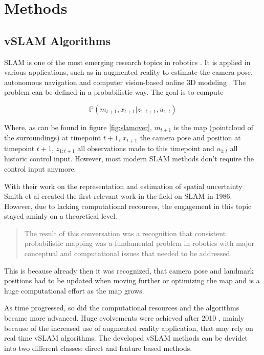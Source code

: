 \chapter{Methods}
\section{vSLAM Algorithms}

SLAM is one of the most emerging research topics in robotics \cite{slamintro}. It is applied in various applications, such as in augmented reality to estimate the camera pose,
autonomous navigation and computer vision-based online 3D modeling \cite{evolved} \cite{dso}.
The problem can be defined in a probabilistic way. The goal is to compute 

$$\mathbb{P}\left(m_{t+1},x_{t+1}|z_{1:t+1},u_{1:t}\right)$$

Where, as can be found in figure \ref{fig:slamover}, $m_{t+1}$ is the map (pointcloud of the surroundings) at timepoint $t+1$, $x_{t+1}$ the 
camera pose and position at timepoint $t+1$, $z_{1:t+1}$ all observations made to this timepoint and $u_{1:t}$ all historic control input. However, most
modern SLAM methods don't require the control input anymore. 


With their work on the representation and estimation of spatial uncertainty \cite{hist1}
Smith et al created the first relevant work in the field on SLAM in 1986. However, due to lacking computational recources, the engagement in this topic stayed aminly
on a theoretical level. 


  \begin{quote}
   The result of this conversation was a recognition that
	consistent probabilistic mapping was a fundamental problem
	in robotics with major conceptual and computational issues
	that needed to be addressed. \cite{hist2}
  \end{quote}
  
This is because already then it was recognized, that camera pose and landmark positions had to be updated when moving further or optimizing the map and is a huge computational 
effort as the map grows. 

As time progressed, so did the computational resources and the algorithms became more advanced. Huge evolvements were achieved after 2010 \cite{evolved}, mainly because of the increased
use of augmented reality application, that may rely on real time vSLAM algorithms. The developed vSLAM methods can be devidet into two different classes: direct and feature based methods.

